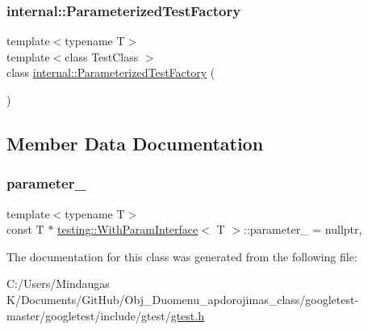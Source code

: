 \mbox{\label{classtesting_1_1_with_param_interface_aaf83241c19b26c1e534944b6e03c0f90}} 
\subsubsection{\texorpdfstring{internal::ParameterizedTestFactory}{internal::ParameterizedTestFactory}\hspace{0.1cm}{\footnotesize\ttfamily [3/3]}}
{\footnotesize\ttfamily template$<$typename T$>$ \\
template$<$class Test\+Class $>$ \\
class \mbox{\hyperlink{classtesting_1_1internal_1_1_parameterized_test_factory}{internal\+::\+Parameterized\+Test\+Factory}} (\begin{DoxyParamCaption}{ }\end{DoxyParamCaption})\hspace{0.3cm}{\ttfamily [friend]}}



\subsection{Member Data Documentation}
\mbox{\label{classtesting_1_1_with_param_interface_ad809d968c4285b535c5c74718d40ccf0}} 
\subsubsection{\texorpdfstring{parameter\_}{parameter\_}}
{\footnotesize\ttfamily template$<$typename T$>$ \\
const T $\ast$ \mbox{\hyperlink{classtesting_1_1_with_param_interface}{testing\+::\+With\+Param\+Interface}}$<$ T $>$\+::parameter\+\_\+ = nullptr\hspace{0.3cm}{\ttfamily [static]}, {\ttfamily [private]}}



The documentation for this class was generated from the following file\+:\begin{DoxyCompactItemize}
\item 
C\+:/\+Users/\+Mindaugas K/\+Documents/\+Git\+Hub/\+Obj\+\_\+\+Duomenu\+\_\+apdorojimas\+\_\+class/googletest-\/master/googletest/include/gtest/\mbox{\hyperlink{googletest-master_2googletest_2include_2gtest_2gtest_8h}{gtest.\+h}}\end{DoxyCompactItemize}
